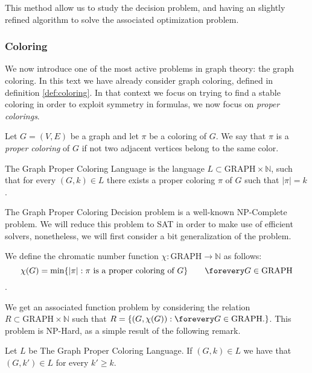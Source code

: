 This method allow us to study the decision problem, and having an slightly refined algorithm to solve the associated optimization problem. 

\subsubsection{Coloring}

We now introduce one of the most active problems in graph theory: the graph coloring. In this text we have already consider graph coloring, defined in definition \ref{def:coloring}. In that context we focus on  trying to find a stable coloring in order to exploit symmetry in formulas, we now focus on \emph{proper colorings}.



\begin{definition}
  Let $G=(V,E)$ be a graph and let $\pi$ be a coloring of $G$. We say that $\pi$ is a \emph{proper coloring} of $G$ if not two adjacent vertices belong to the same color.  
\end{definition}

\begin{definition}
  The Graph Proper Coloring Language is the language $L\subset \text{GRAPH}\times \mathbb{N}$, such that for every $(G,k)\in L$ there exists a proper coloring $\pi$ of $G$ such that $|\pi| = k$.  
\end{definition}

The  Graph Proper Coloring Decision problem is a well-known NP-Complete problem. We will reduce this problem to SAT in order to make use of efficient solvers, nonetheless, we will first consider a bit generalization of the problem.

\begin{definition}
  We define the chromatic number function $\chi:\text{GRAPH}\to \mathbb{N}$ as follows:
  $$ \chi(G) = \min\{|\pi|: \pi \text{ is a proper coloring of } G\} \qquad \forevery G \in \text{GRAPH}$$. 
\end{definition}

We get an associated function problem by considering the relation $R \subset \text{GRAPH}\times \mathbb{N}$ such that $R = \{(G,\chi(G)): \forevery G \in \text{GRAPH}.\}$. This problem is NP-Hard, as a simple result of the following remark.

\begin{remark}\label{remark:proper}
  Let $L$ be  The Graph Proper Coloring Language. If $(G,k) \in L$ we have that $(G,k')\in L$ for every $k'\ge k$.
\end{remark}

